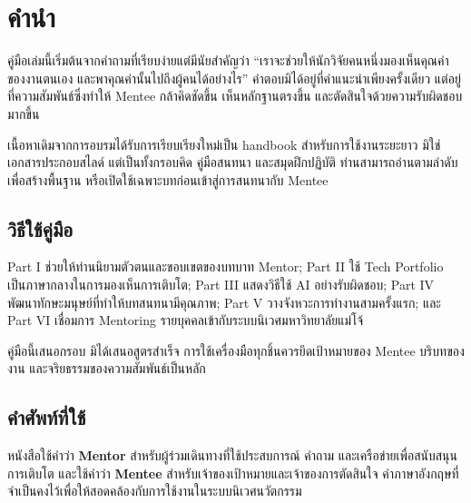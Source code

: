 \chapter*{คำนำ}

คู่มือเล่มนี้เริ่มต้นจากคำถามที่เรียบง่ายแต่มีนัยสำคัญว่า \enquote{เราจะช่วยให้นักวิจัยคนหนึ่งมองเห็นคุณค่าของงานตนเอง และพาคุณค่านั้นไปถึงผู้คนได้อย่างไร} คำตอบมิได้อยู่ที่คำแนะนำเพียงครั้งเดียว แต่อยู่ที่ความสัมพันธ์ซึ่งทำให้ Mentee กล้าคิดชัดขึ้น เห็นหลักฐานตรงขึ้น และตัดสินใจด้วยความรับผิดชอบมากขึ้น

เนื้อหาเดิมจากการอบรมได้รับการเรียบเรียงใหม่เป็น handbook สำหรับการใช้งานระยะยาว มิใช่เอกสารประกอบสไลด์ แต่เป็นทั้งกรอบคิด คู่มือสนทนา และสมุดฝึกปฏิบัติ ท่านสามารถอ่านตามลำดับเพื่อสร้างพื้นฐาน หรือเปิดใช้เฉพาะบทก่อนเข้าสู่การสนทนากับ Mentee

\section*{วิธีใช้คู่มือ}
Part I ช่วยให้ท่านนิยามตัวตนและขอบเขตของบทบาท Mentor; Part II ใช้ Tech Portfolio เป็นภาษากลางในการมองเห็นการเติบโต; Part III แสดงวิธีใช้ AI อย่างรับผิดชอบ; Part IV พัฒนาทักษะมนุษย์ที่ทำให้บทสนทนามีคุณภาพ; Part V วางจังหวะการทำงานสามครั้งแรก; และ Part VI เชื่อมการ Mentoring รายบุคคลเข้ากับระบบนิเวศมหาวิทยาลัยแม่โจ้

\begin{mentornote}
คู่มือนี้เสนอกรอบ มิได้เสนอสูตรสำเร็จ การใช้เครื่องมือทุกชิ้นควรยึดเป้าหมายของ Mentee บริบทของงาน และจริยธรรมของความสัมพันธ์เป็นหลัก
\end{mentornote}

\section*{คำศัพท์ที่ใช้}
หนังสือใช้คำว่า \textbf{Mentor} สำหรับผู้ร่วมเดินทางที่ใช้ประสบการณ์ คำถาม และเครือข่ายเพื่อสนับสนุนการเติบโต และใช้คำว่า \textbf{Mentee} สำหรับเจ้าของเป้าหมายและเจ้าของการตัดสินใจ คำภาษาอังกฤษที่จำเป็นคงไว้เพื่อให้สอดคล้องกับการใช้งานในระบบนิเวศนวัตกรรม
